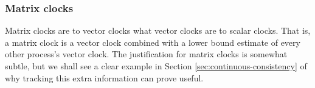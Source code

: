 \documentclass[]             %
{NASA}                       %
\theoremstyle{definition}
\begin{document}









\subsubsection{Matrix clocks}

Matrix clocks are to vector clocks what vector clocks are to scalar
clocks. That is, a matrix clock is a vector clock combined with a
lower bound estimate of every other process's vector clock. The
justification for matrix clocks is somewhat subtle, but we shall see a
clear example in Section \ref{sec:continuous-consistency} of why
tracking this extra information can prove useful.
\end{document}
